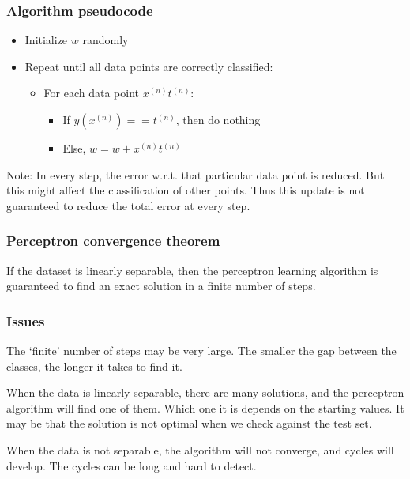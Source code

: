 \documentclass[a4paper,12pt]{article}
\begin{document}
\subsubsection{Algorithm pseudocode}

\begin{itemize}
\item
Initialize $w$ randomly
\item
Repeat until all data points are correctly classified: 
\begin{itemize}
\item
For each data point $x^{(n)}t^{(n)}$: 
\begin{itemize}
\item
If $y(x^{(n)}) == t^{(n)}$, then do nothing
\item
Else, $w = w + x^{(n)}t^{(n)}$
\end{itemize}
\end{itemize}
\end{itemize}
Note: In every step, the error w.r.t. that particular data point is reduced. But this might affect the classification of other points. Thus this update is not guaranteed to reduce the total error at every step. 


\subsubsection{Perceptron convergence theorem}

If the dataset is linearly separable, then the perceptron learning algorithm is guaranteed to find an exact solution in a finite number of steps. 

\subsubsection{Issues}

The `finite' number of steps may be very large. The smaller the gap between the classes, the longer it takes to find it. 

When the data is linearly separable, there are many solutions, and the perceptron algorithm will find one of them. Which one it is depends on the starting values. It may be that the solution is not optimal when we check against the test set. 

When the data is not separable, the algorithm will not converge, and cycles will develop. The cycles can be long and hard to detect. 



\clearpage
\end{document}
